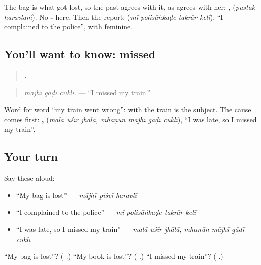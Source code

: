 The bag is what got lost, so the past agrees with it, as \textbf{ } agrees with her: \textbf{ }, \textbf{ } (\emph{pustak haravlaṁ}). No \textbf{-} here. Then the report: \textbf{   } (\emph{mī polisāṅkaḍe takrār kelī}), \textquotedblleft{}I complained to the police\textquotedblright{}, with \textbf{} feminine.

\subsection*{You'll want to know: missed}
\begin{quote}
\textbf{  .}
\end{quote}

\begin{quote}
\emph{mājhī gāḍī cuklī.} — \textquotedblleft{}I missed my train.\textquotedblright{}
\end{quote}

Word for word \textquotedblleft{}my train went wrong\textquotedblright{}: with \textbf{} the train is the subject. The cause comes first: \textbf{  ,    } (\emph{malā uśīr jhālā, mhaṇūn mājhī gāḍī cuklī}), \textquotedblleft{}I was late, so I missed my train\textquotedblright{}.

\subsection*{Your turn}
Say these aloud:

\begin{itemize}
\raggedright
  \item \textquotedblleft{}My bag is lost\textquotedblright{} — \emph{mājhī piśvī haravlī}
  \item \textquotedblleft{}I complained to the police\textquotedblright{} — \emph{mī polisāṅkaḍe takrār kelī}
  \item \textquotedblleft{}I was late, so I missed my train\textquotedblright{} — \emph{malā uśīr jhālā, mhaṇūn mājhī gāḍī cuklī}
\end{itemize}

\begin{tcolorbox}[breakable,colback=teal!4,colframe=teal!35!black,title={Before you move on}]
\textquotedblleft{}My bag is lost\textquotedblright{}? (\textbf{  }.) \textquotedblleft{}My book is lost\textquotedblright{}? (\textbf{  }.) \textquotedblleft{}I missed my train\textquotedblright{}? (\textbf{  }.)
\end{tcolorbox}
